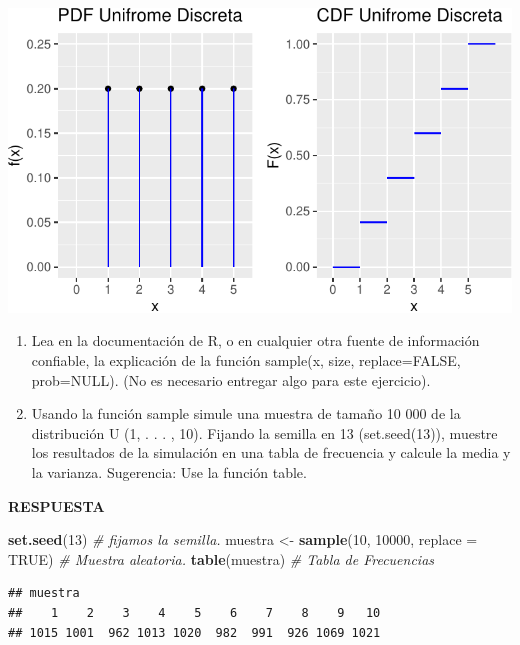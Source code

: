 \documentclass[11pt,]{article}
\newenvironment{Shaded}{\begin{snugshade}}{\end{snugshade}}
\newcommand{\CommentTok}[1]{\textcolor[rgb]{0.56,0.35,0.01}{\textit{#1}}}
\newcommand{\DataTypeTok}[1]{\textcolor[rgb]{0.13,0.29,0.53}{#1}}
\newcommand{\DecValTok}[1]{\textcolor[rgb]{0.00,0.00,0.81}{#1}}
\newcommand{\KeywordTok}[1]{\textcolor[rgb]{0.13,0.29,0.53}{\textbf{#1}}}
\newcommand{\NormalTok}[1]{#1}
\newcommand{\OtherTok}[1]{\textcolor[rgb]{0.56,0.35,0.01}{#1}}
\newcommand{\StringTok}[1]{\textcolor[rgb]{0.31,0.60,0.02}{#1}}
\newcommand{\res}{\textbf{RESPUESTA}\\}
\begin{document}
\begin{center}\includegraphics{Tarea_1_files/figure-latex/unnamed-chunk-3-1} \end{center}

\begin{enumerate}
\def\labelenumi{\alph{enumi}.}
\setcounter{enumi}{1}
\item
  Lea en la documentación de \textsc{R}, o en cualquier otra fuente de
  información confiable, la explicación de la función sample(x, size,
  replace=FALSE, prob=NULL). (No es necesario entregar algo para este
  ejercicio).
\item
  Usando la función sample simule una muestra de tamaño 10 000 de la
  distribución U (1, . . . , 10). Fijando la semilla en 13
  (set.seed(13)), muestre los resultados de la simulación en una tabla
  de frecuencia y calcule la media y la varianza. Sugerencia: Use la
  función table.
\end{enumerate}

\res

\begin{Shaded}
\begin{Highlighting}[]
\KeywordTok{set.seed}\NormalTok{(}\DecValTok{13}\NormalTok{) }\CommentTok{# fijamos la semilla.}
\NormalTok{muestra <-}\StringTok{ }\KeywordTok{sample}\NormalTok{(}\DecValTok{10}\NormalTok{, }\DecValTok{10000}\NormalTok{, }\DataTypeTok{replace =} \OtherTok{TRUE}\NormalTok{) }\CommentTok{# Muestra aleatoria.}
\KeywordTok{table}\NormalTok{(muestra) }\CommentTok{# Tabla de Frecuencias}
\end{Highlighting}
\end{Shaded}

\begin{verbatim}
## muestra
##    1    2    3    4    5    6    7    8    9   10 
## 1015 1001  962 1013 1020  982  991  926 1069 1021
\end{verbatim}
\end{document}
